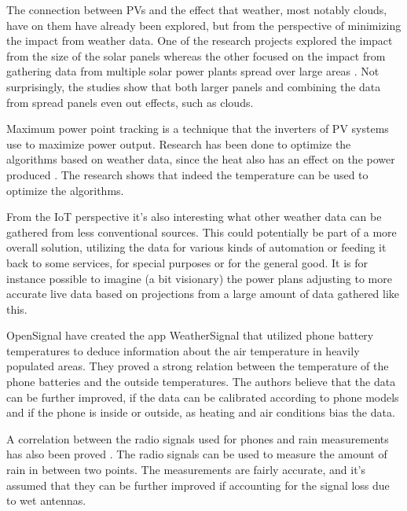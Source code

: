 The connection between PVs and the effect that weather, most notably
clouds, have on them have already been explored, but from the
perspective of minimizing the impact from weather data.  One of the
research projects explored the impact from the size of the solar panels
\citep{cloudTrack} whereas the other focused on the impact from
gathering data from multiple solar power plants spread over large
areas \citep{southafrica}.  Not surprisingly, the studies show that
both larger panels and combining the data from spread panels even
out effects, such as clouds.

Maximum power point tracking is a technique that the inverters of PV
systems use to maximize power output.  Research has been done to
optimize the algorithms based on weather data, since the heat also has
an effect on the power produced \citep{mppt2004}.  The research shows
that indeed the temperature can be used to optimize the algorithms.

From the IoT perspective it's also interesting what other weather data
can be gathered from less conventional sources.  This could potentially
be part of a more overall solution, utilizing the data for various
kinds of automation or feeding it back to some services, for special
purposes or for the general good.  It is for instance possible to
imagine (a bit visionary) the power plans adjusting to more accurate
live data based on projections from a large amount of data gathered
like this.

OpenSignal have created the app WeatherSignal that utilized phone
battery temperatures \citep{temperatures2013} to deduce information
about the air temperature in heavily populated areas.  They proved a
strong relation between the temperature of the phone batteries and
the outside temperatures.  The authors believe that the data can be
further improved, if the data can be calibrated according to phone
models and if the phone is inside or outside, as heating and air
conditions bias the data.

A correlation between the radio signals used for phones and rain
measurements has also been proved \citep{rainfall2007}.  The radio
signals can be used to measure the amount of rain in between two
points.  The measurements are fairly accurate, and it's assumed that
they can be further improved if accounting for the signal loss due to
wet antennas.

